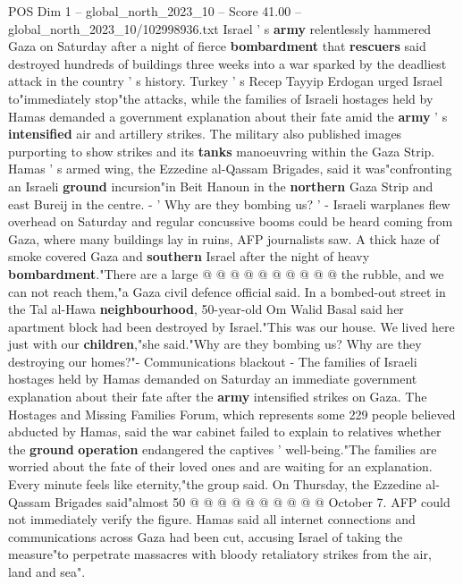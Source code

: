 \begin{textsample}{POS Dim 1 – global\_north\_2023\_10 – Score 41.00 – global\_north\_2023\_10/102998936.txt}  \label{ex:f1_pos_320}
Israel ' s \textbf{army} relentlessly hammered Gaza on Saturday after a night of fierce \textbf{bombardment} that \textbf{rescuers} said destroyed hundreds of buildings three weeks into a war sparked by the deadliest attack in the country ' s history.
Turkey ' s Recep Tayyip Erdogan urged Israel to"immediately stop"the attacks, while the families of Israeli hostages held by Hamas demanded a government explanation about their fate amid the \textbf{army} ' s \textbf{intensified} air and artillery strikes.
The military also published images purporting to show strikes and its \textbf{tanks} manoeuvring within the Gaza Strip.
Hamas ' s armed wing, the Ezzedine al-Qassam Brigades, said it was"confronting an Israeli \textbf{ground} incursion"in Beit Hanoun in the \textbf{northern} Gaza Strip and east Bureij in the centre. - ' Why are they bombing us? ' - Israeli warplanes flew overhead on Saturday and regular concussive booms could be heard coming from Gaza, where many buildings lay in ruins, AFP journalists saw.
A thick haze of smoke covered Gaza and \textbf{southern} Israel after the night of heavy \textbf{bombardment}."There are a large @ @ @ @ @ @ @ @ @ @ the rubble, and we can not reach them,"a Gaza civil defence official said.
In a bombed-out street in the Tal al-Hawa \textbf{neighbourhood}, 50-year-old Om Walid Basal said her apartment block had been destroyed by Israel."This was our house.
We lived here just with our \textbf{children},"she said."Why are they bombing us?
Why are they destroying our homes?"- Communications blackout - The families of Israeli hostages held by Hamas demanded on Saturday an immediate government explanation about their fate after the \textbf{army} intensified strikes on Gaza.
The Hostages and Missing Families Forum, which represents some 229 people believed abducted by Hamas, said the war cabinet failed to explain to relatives whether the \textbf{ground} \textbf{operation} endangered the captives ' well-being."The families are worried about the fate of their loved ones and are waiting for an explanation.
Every minute feels like eternity,"the group said.
On Thursday, the Ezzedine al-Qassam Brigades said"almost 50 @ @ @ @ @ @ @ @ @ @ October 7.
AFP could not immediately verify the figure.
Hamas said all internet connections and communications across Gaza had been cut, accusing Israel of taking the measure"to perpetrate massacres with bloody retaliatory strikes from the air, land and sea".

\end{textsample}
